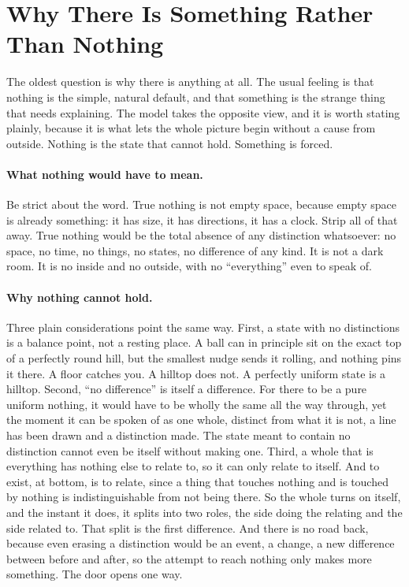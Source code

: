 \section{Why There Is Something Rather Than Nothing}
\label{sec:bootstrap}

The oldest question is why there is anything at all. The usual feeling is that nothing is the
simple, natural default, and that something is the strange thing that needs explaining. The
model takes the opposite view, and it is worth stating plainly, because it is what lets the
whole picture begin without a cause from outside. Nothing is the state that cannot hold.
Something is forced.

\paragraph{What nothing would have to mean.}
Be strict about the word. True nothing is not empty space, because empty space is already
something: it has size, it has directions, it has a clock. Strip all of that away. True nothing
would be the total absence of any distinction whatsoever: no space, no time, no things, no
states, no difference of any kind. It is not a dark room. It is no inside and no outside, with
no ``everything'' even to speak of.

\paragraph{Why nothing cannot hold.}
Three plain considerations point the same way. First, a state with no distinctions is a
balance point, not a resting place. A ball can in principle sit on the exact top of a
perfectly round hill, but the smallest nudge sends it rolling, and nothing pins it there. A
floor catches you. A hilltop does not. A perfectly uniform state is a hilltop. Second, ``no
difference'' is itself a difference. For there to be a pure uniform nothing, it would have to
be wholly the same all the way through, yet the moment it can be spoken of as one whole,
distinct from what it is not, a line has been drawn and a distinction made. The state meant to
contain no distinction cannot even be itself without making one. Third, a whole that is
everything has nothing else to relate to, so it can only relate to itself. And to exist, at
bottom, is to relate, since a thing that touches nothing and is touched by nothing is
indistinguishable from not being there. So the whole turns on itself, and the instant it does,
it splits into two roles, the side doing the relating and the side related to. That split is
the first difference. And there is no road back, because even erasing a distinction would be
an event, a change, a new difference between before and after, so the attempt to reach nothing
only makes more something. The door opens one way.

